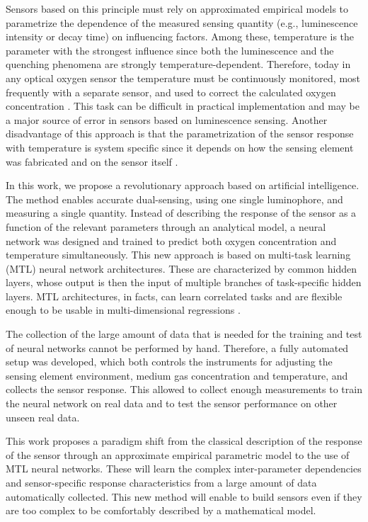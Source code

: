 \documentclass[9pt,twocolumn,twoside,pdftex]{optica}
\begin{document}
Sensors based on this principle must rely on approximated empirical models to parametrize the dependence of the measured sensing quantity (e.g., luminescence intensity or decay time) on influencing factors. Among these, temperature is the parameter with the strongest influence since both the luminescence and the quenching phenomena are strongly temperature-dependent. Therefore, today in any optical oxygen sensor the temperature must be continuously monitored, most frequently with a separate sensor, and used to correct the calculated oxygen concentration \cite{Li2015}. This task can be difficult in practical implementation and may be a major source of error in sensors based on luminescence sensing. Another disadvantage of this approach is that the parametrization of the sensor response with temperature is system specific since it depends  on how the sensing element was fabricated and on the sensor itself \cite{Xu1994,Draxler1995,Hartmann1996,Mills1998,Badocco2008,Dini2011}.

In this work, we propose a revolutionary approach based on artificial intelligence. The method enables accurate dual-sensing, using one single luminophore, and measuring a single quantity.
Instead of describing the response of the sensor as a function of the relevant parameters through an analytical model, a neural network  was designed and trained to predict both oxygen concentration and temperature simultaneously.
This new approach is based on multi-task learning (MTL) neural network architectures. These are characterized by common hidden layers, whose output is then the input of multiple branches of task-specific hidden layers. MTL architectures, in facts, can learn correlated tasks \cite{Argyriou2006, Thrun1996, Caruana1997, Zhang2017, Baxter2000, Thung2018} and are flexible enough to be usable in multi-dimensional regressions \cite{Michelucci2019_2}.

The collection of the large amount of data that is needed for the training and test of neural networks cannot be performed by hand. Therefore, a fully automated setup was developed, which both controls the instruments for adjusting the sensing element environment, medium gas concentration and temperature, and collects the sensor response. This allowed to collect enough measurements to train the neural network on real data and to test the sensor performance on other unseen real data.

This work proposes a paradigm shift from the classical description of the response of the sensor through an approximate empirical parametric model to the use of MTL neural networks. 
These will learn the complex inter-parameter dependencies and sensor-specific response characteristics from a large amount of data automatically collected. This new method will enable to build sensors even if they are too complex to be comfortably described by a mathematical model.
\end{document}
